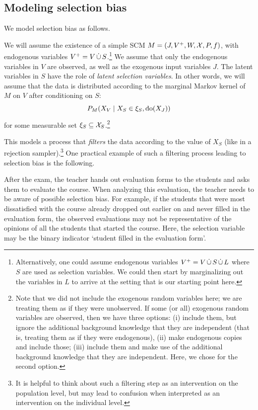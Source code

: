 \subsection{Modeling selection bias}


We model selection bias as follows. 
\begin{Not}
We will assume the existence of a simple SCM $M = \left ( J, V^+, W, \mathcal{X}, P, f \right )$, with endogenous variables $V^+ = V \,\dot{\cup}\, S$.\footnote{Alternatively, one could assume endogenous variables $V^+ = V \,\dot{\cup}\, S \,\dot{\cup}\, L$ where $S$ are used as selection variables. We could then start by marginalizing out the variables in $L$ to arrive at the setting that is our starting point here.}
We assume that only the endogenous variables in $V$ are observed, as well as the exogenous input variables $J$.
The latent variables in $S$ have the role of \emph{latent selection variables}.
In other words, we will assume that the data is distributed according to the marginal Markov kernel of $M$ on $V$ after conditioning on $S$:
$$P_M(X_V \mid X_S \in \xi_S, \operatorname{do}(X_J))$$
for some measurable set $\xi_S \subseteq \mathcal{X}_S$.\footnote{Note that we did not include the exogenous random variables here; we are treating them as if they were unobserved. If some (or all) exogenous random variables are observed, then we have three options: (i) include them, but ignore the additional background knowledge that they are independent (that is, treating them as if they were endogenous), (ii) make endogenous copies and include those; (iii) include them and make use of the additional background knowledge that they are independent. Here, we chose for the second option.}
\end{Not}
This models a process that \emph{filters} the data according to the value of $X_S$ (like in a rejection sampler).\footnote{It is helpful to think about such a filtering step as an intervention on the population level, but may lead to confusion when interpreted as an intervention on the individual level.}
One practical example of such a filtering process leading to selection bias is the following.
\begin{Eg}
  After the exam, the teacher hands out evaluation forms to the students and asks them to evaluate the course.
  When analyzing this evaluation, the teacher needs to be aware of possible selection bias.
  For example, if the students that were most dissatisfied with the course already dropped out earlier on and never filled in the evaluation form, the observed evaluations may not be representative of the opinions of all the students that started the course.
  Here, the selection variable may be the binary indicator `student filled in the evaluation form'.
\end{Eg}
  
